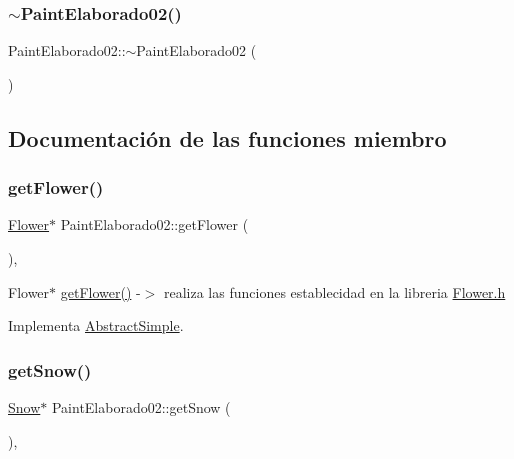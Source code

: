 \subsubsection{\texorpdfstring{$\sim$PaintElaborado02()}{~PaintElaborado02()}}
{\footnotesize\ttfamily Paint\+Elaborado02\+::$\sim$\+Paint\+Elaborado02 (\begin{DoxyParamCaption}{ }\end{DoxyParamCaption})\hspace{0.3cm}{\ttfamily [inline]}}



\subsection{Documentación de las funciones miembro}
\mbox{\label{class_paint_elaborado02_a8419fd52c4695f73b0b0ade31450f0ff}} 
\subsubsection{\texorpdfstring{getFlower()}{getFlower()}}
{\footnotesize\ttfamily \mbox{\hyperlink{class_flower}{Flower}}$\ast$ Paint\+Elaborado02\+::get\+Flower (\begin{DoxyParamCaption}{ }\end{DoxyParamCaption})\hspace{0.3cm}{\ttfamily [inline]}, {\ttfamily [virtual]}}

Flower$\ast$ \mbox{\hyperlink{class_paint_elaborado02_a8419fd52c4695f73b0b0ade31450f0ff}{get\+Flower()}} -\/$>$ realiza las funciones establecidad en la libreria \mbox{\hyperlink{_flower_8h}{Flower.\+h}} 

Implementa \mbox{\hyperlink{class_abstract_simple_a32da8b68a506bf223035acc62451724f}{Abstract\+Simple}}.

\mbox{\label{class_paint_elaborado02_ab2e3d866b6b3a650b7cb1ca7186ec3a3}} 
\subsubsection{\texorpdfstring{getSnow()}{getSnow()}}
{\footnotesize\ttfamily \mbox{\hyperlink{class_snow}{Snow}}$\ast$ Paint\+Elaborado02\+::get\+Snow (\begin{DoxyParamCaption}{ }\end{DoxyParamCaption})\hspace{0.3cm}{\ttfamily [inline]}, {\ttfamily [virtual]}}

